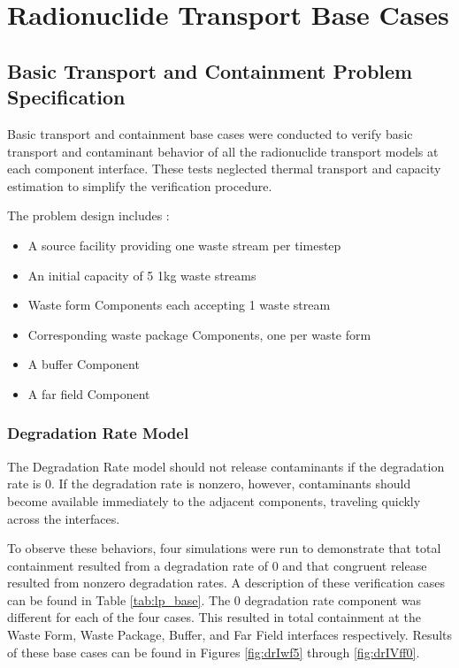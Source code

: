 \section{Radionuclide Transport Base Cases}\label{sec:nuclide_base_cases}
\subsection{Basic Transport and Containment Problem Specification}
Basic transport and containment base cases were conducted to verify basic 
transport and contaminant behavior of all the radionuclide transport models at 
each component interface. These tests neglected thermal transport and capacity 
estimation to simplify the verification procedure.  

The problem design includes : 
\begin{itemize}
\item{A source facility providing one waste stream per timestep}
\item{An initial capacity of 5 1kg waste streams}
\item{Waste form Components each accepting 1 waste stream} 
\item{Corresponding waste package Components, one per waste form}
\item{A buffer Component}
\item{A far field Component}
\end{itemize}

\subsubsection{Degradation Rate Model}
The Degradation Rate model should not release contaminants if the degradation 
rate is 0. If the degradation rate is nonzero, however, contaminants should 
become available immediately to the adjacent components, traveling quickly 
across the interfaces. 

To observe these behaviors, four simulations were run to demonstrate that total 
containment resulted from a degradation rate of 0 and that congruent release 
resulted from nonzero degradation rates. A description of these verification 
cases can be found in Table \ref{tab:lp_base}. The 0 degradation rate component was 
different for each of the four cases. This resulted in total containment at the 
Waste Form, Waste Package, Buffer, and Far Field interfaces respectively. 
Results of these base cases can be found in Figures 
\ref{fig:drIwf5} through \ref{fig:drIVff0}.
\FloatBarrier


\FloatBarrier

